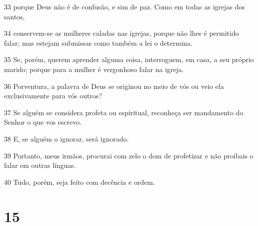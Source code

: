 \par 33 porque Deus não é de confusão, e sim de paz. Como em todas as igrejas dos santos,
\par 34 conservem-se as mulheres caladas nas igrejas, porque não lhes é permitido falar; mas estejam submissas como também a lei o determina.
\par 35 Se, porém, querem aprender alguma coisa, interroguem, em casa, a seu próprio marido; porque para a mulher é vergonhoso falar na igreja.
\par 36 Porventura, a palavra de Deus se originou no meio de vós ou veio ela exclusivamente para vós outros?
\par 37 Se alguém se considera profeta ou espiritual, reconheça ser mandamento do Senhor o que vos escrevo.
\par 38 E, se alguém o ignorar, será ignorado.
\par 39 Portanto, meus irmãos, procurai com zelo o dom de profetizar e não proibais o falar em outras línguas.
\par 40 Tudo, porém, seja feito com decência e ordem.

\chapter{15}

